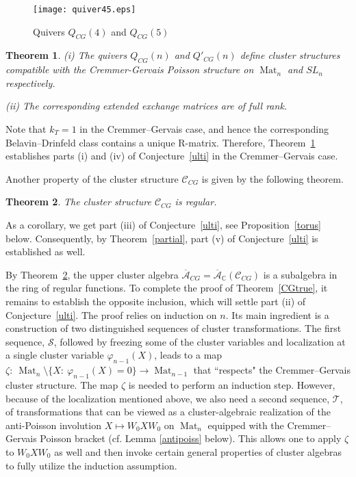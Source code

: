 \documentclass{amsart}
\newtheorem{theorem}{Theorem}
\theoremstyle{definition}
\theoremstyle{remark}
\numberwithin{equation}{section}
\numberwithin{theorem}{section}
\begin{document}
\begin{figure}[ht]
\begin{center}
\texttt{[image: quiver45.eps]}
\caption{Quivers $Q_{CG}(4)$ and $Q_{CG}(5)$}
\label{fig:Qcg45}
\end{center}
\end{figure}

\begin{theorem}
\label{quiver} {\rm (i)}
The quivers $Q_{CG}(n)$  and $Q'_{CG}(n)$ define cluster structures compatible with the
Cremmer-Gervais Poisson structure on ${\operatorname{Mat}}_n$ and $SL_n$ respectively.

{\rm (ii)} The corresponding extended exchange matrices are of full rank.
\end{theorem}

Note that $k_T=1$ in the Cremmer--Gervais case, and hence the corresponding
Belavin--Drinfeld class contains a unique R-matrix. Therefore, Theorem~\ref{quiver} establishes
parts (i) and (iv) of Conjecture~\ref{ulti}  in the Cremmer--Gervais case.

Another property of the cluster structure ${{\mathcal C}}_{CG}$ is given by the following theorem.

\begin{theorem}
\label{regular}
The  cluster structure ${{\mathcal C}}_{CG}$ is regular.
\end{theorem}

As a corollary, we get part (iii) of  Conjecture~\ref{ulti}, see  Proposition~\ref{torus} below.
Consequently, by Theorem~\ref{partial}, part (v) of Conjecture~\ref{ulti} is established as well.

By Theorem~\ref{regular}, the upper cluster algebra ${\overline{{\mathcal A}}}_{CG}={\overline{{\mathcal A}}}_{{\mathbb C}}({{\mathcal C}}_{CG})$ is a
subalgebra in the ring of regular
 functions. To complete the proof of Theorem~\ref{CGtrue}, it remains to
establish the opposite inclusion, which will settle part (ii) of Conjecture~\ref{ulti}.
 The proof relies on induction on $n$. Its main ingredient is a construction of
two distinguished sequences of cluster
 transformations. The first sequence, $\mathcal S$, followed by freezing some of the
cluster variables and localization
 at a single cluster variable ${{\varphi}}_{n-1}(X)$, leads to a map $\zeta {{:\ }} {\operatorname{Mat}}_n \setminus
 \{X{{:\ }}{{\varphi}}_{n-1}(X)=0\}\to
{\operatorname{Mat}}_{n-1}$ that ``respects" the Cremmer--Gervais cluster
 structure. The map $\zeta$ is needed to perform an induction step. However, because
of the localization mentioned above, we also need a second sequence, $\mathcal T$, 
of transformations that can be viewed as a cluster-algebraic realization of the
anti-Poisson involution
 $X \mapsto W_0 X W_0$ on ${\operatorname{Mat}}_n$ equipped with the Cremmer--Gervais Poisson bracket (cf.
Lemma \ref{antipoiss} below). This allows one to apply $\zeta$ to
  $W_0 X W_0$ as well and then invoke certain general properties of cluster algebras
to fully utilize the induction assumption.
\end{document}
